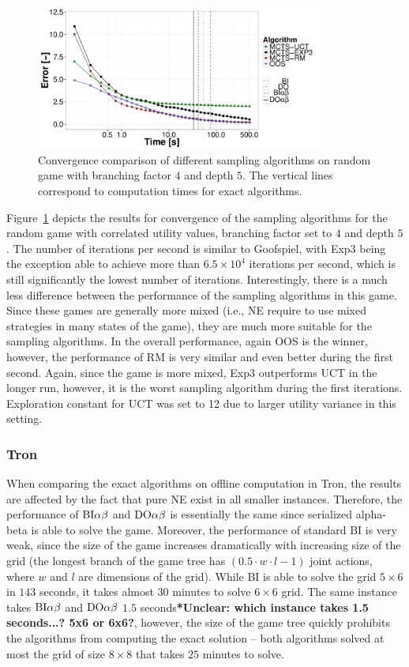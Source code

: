 \begin{figure}
\centering
\includegraphics[width=0.85\textwidth]{figures/convergence-rg.pdf}
\caption{Convergence comparison of different sampling algorithms on random game with branching factor $4$ and depth $5$. The vertical lines correspond to computation times for exact algorithms.} \label{fig:off:conv:rg}
\end{figure}

Figure~\ref{fig:off:conv:rg} depicts the results for convergence of the sampling algorithms for the random game with correlated utility values, branching factor set to $4$ and depth $5$. The number of iterations per second is similar to Goofspiel, with Exp3 being the exception able to achieve more than $6.5\times10^4$ iterations per second, which is still significantly the lowest number of iterations.
Interestingly, there is a much less difference between the performance of the sampling algorithms in this game. Since these games are generally more mixed (i.e., NE require to use mixed strategies in many states of the game), they are much more suitable for the sampling algorithms. In the overall performance, again OOS is the winner, however, the performance of RM is very similar and even better during the first second. Again, since the game is more mixed, Exp3 outperforms UCT in the longer run, however, it is the worst sampling algorithm during the first iterations. Exploration constant for UCT was set to 12 due to larger utility variance in this setting.

\subsubsection{Tron}

When comparing the exact algorithms on offline computation in Tron, the results are affected by the fact that pure NE exist in all smaller instances.
Therefore, the performance of $\textrm{BI}\alpha\beta$ and $\textrm{DO}\alpha\beta$ is essentially the same since serialized alpha-beta is able to solve the game. Moreover, the performance of standard BI is very weak, since the size of the game increases dramatically with increasing size of the grid (the longest branch of the game tree has $\left(0.5\cdot w\cdot l - 1\right)$ joint actions, where $w$ and $l$ are dimensions of the grid). While BI is able to solve the grid $5\times6$ in $143$ seconds, it takes almost $30$ minutes to solve $6\times6$ grid. The same instance takes $\textrm{BI}\alpha\beta$ and $\textrm{DO}\alpha\beta$ $1.5$ seconds{\color{red}\bf **Unclear: which instance takes 1.5 seconds...? 5x6 or 6x6?}, however, the size of the game tree quickly prohibits the algorithms from computing the exact solution -- both algorithms solved at most the grid of size $8\times8$ that takes $25$ minutes to solve. 

